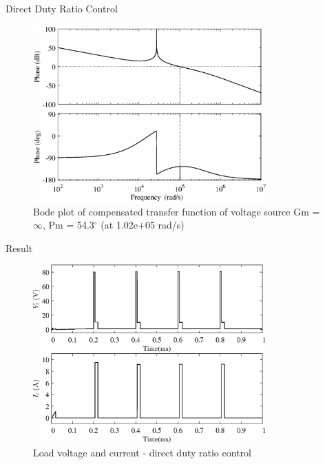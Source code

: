 \documentclass[10pt]{beamer}
\begin{document}
\begin{frame}{Direct Duty Ratio Control}
  \begin{figure}
    \centering
    \includegraphics[width=0.8\textwidth]{compensated-vs}
    \caption{Bode plot of compensated transfer function of voltage source \hspace{1cm} Gm = $\infty$,  Pm = 54.3$^\circ$ (at 1.02e+05 rad/s)}
    \label{fig:comp-vs}
  \end{figure}
\end{frame}

\begin{frame}{Result}
  \begin{figure}
    \centering
    \includegraphics[width=0.8\textwidth]{load_comp}
    \caption{Load voltage and current - direct duty ratio control}
    \label{fig:1b}
  \end{figure}
\end{frame}
\end{document}

